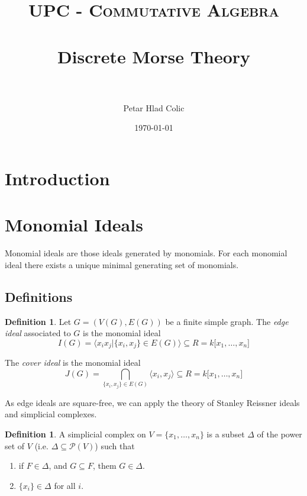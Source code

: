 \documentclass[paper=a4, fontsize=11pt]{scrartcl} %
\title{
\normalfont \normalsize
\textsc{UPC - Commutative Algebra} \\ [25pt] %
\horrule{0.5pt} \\[0.4cm] %
\huge Discrete Morse Theory \\ %
\horrule{2pt} \\[0.5cm] %
}
\author{Petar Hlad Colic} %
\date{\normalsize\today} %
\theoremstyle{plain}
\theoremstyle{definition}
\newtheorem{defn}[thm]{Definition}
\begin{document}
\maketitle %



\section{Introduction}


\section{Monomial Ideals}
Monomial ideals are those ideals generated by monomials. For each monomial ideal there exists a unique minimal generating set of monomials.

\subsection{Definitions}
\begin{defn}
Let $G = (V(G),E(G))$ be a finite simple graph. The \textit{edge ideal} associated to $G$ is the monomial ideal
$$ I(G) = \langle x_i x_j \vert \lbrace	x_i, x_j \rbrace \in E(G) \rangle \subseteq R = k \lbrack x_1, \dots, x_n \rbrack$$

The \textit{cover ideal} is the monomial ideal
$$J(G) = \bigcap_{\lbrace	x_i, x_j \rbrace \in E(G)}  \langle x_i, x_j \rangle \subseteq R = k \lbrack x_1, \dots, x_n \rbrack$$

\end{defn}

As edge ideals are square-free, we can apply the theory of Stanley Reissner ideals and simplicial complexes. \cite{Mo12}

\begin{defn}
A simplicial complex on $V = \lbrace x_1, \dots , x_n \rbrace$ is a subset $\Delta$ of the power set of $V$ (i.e. $\Delta \subseteq \mathcal{P}(V)$) such that
\begin{enumerate}
\item if $F \in \Delta$, and $G\subseteq F$, them $G \in \Delta$.
\item $\lbrace x_i \rbrace \in \Delta$ for all $i$.
\end{enumerate}
\end{defn}
\end{document}
